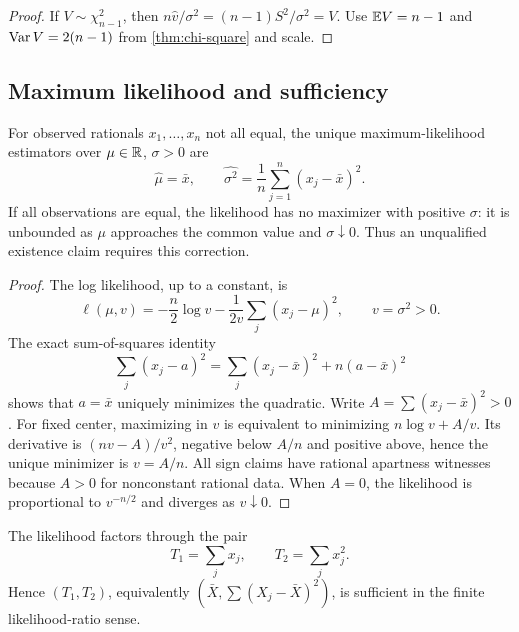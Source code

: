 \begin{proof}
If $V\sim\chi^2_{n-1}$, then $n\widehat v/\sigma^2=(n-1)S^2/\sigma^2=V$.  Use $\mathbb E V=n-1$ and $\operatorname{Var} V=2(n-1)$ from \cref{thm:chi-square} and scale.
\end{proof}

\subsection{Maximum likelihood and sufficiency}

\begin{theorem}\label{thm:mle}
For observed rationals $x_1,\dots,x_n$ not all equal, the unique maximum-likelihood estimators over $\mu\in\mathbb R$, $\sigma>0$ are
\begin{equation}\label{eq:mle}
 \widehat\mu=\bar x,
 \qquad
 \widehat{\sigma^2}=\frac1n\sum_{j=1}^n(x_j-\bar x)^2.
\end{equation}
If all observations are equal, the likelihood has no maximizer with positive $\sigma$: it is unbounded as $\mu$ approaches the common value and $\sigma\downarrow0$.  Thus an unqualified existence claim requires this correction.
\end{theorem}

\begin{proof}
The log likelihood, up to a constant, is
\[
 \ell(\mu,v)=-\frac n2\log v-\frac1{2v}\sum_j(x_j-\mu)^2,
 \qquad v=\sigma^2>0.
\]
The exact sum-of-squares identity
\begin{equation}\label{eq:ss-decomp}
 \sum_j(x_j-a)^2=
 \sum_j(x_j-\bar x)^2+n(a-\bar x)^2
\end{equation}
shows that $a=\bar x$ uniquely minimizes the quadratic.  Write $A=\sum(x_j-\bar x)^2>0$.  For fixed center, maximizing in $v$ is equivalent to minimizing
$n\log v+A/v$.  Its derivative is $(nv-A)/v^2$, negative below $A/n$ and positive above, hence the unique minimizer is $v=A/n$.  All sign claims have rational apartness witnesses because $A>0$ for nonconstant rational data.  When $A=0$, the likelihood is proportional to $v^{-n/2}$ and diverges as $v\downarrow0$.
\end{proof}

\begin{proposition}\label{prop:sufficient}
The likelihood factors through the pair
\[
 T_1=\sum_jx_j,
 \qquad T_2=\sum_jx_j^2.
\]
Hence $(T_1,T_2)$, equivalently $(\bar X,\sum(X_j-\bar X)^2)$, is sufficient in the finite likelihood-ratio sense.
\end{proposition}

